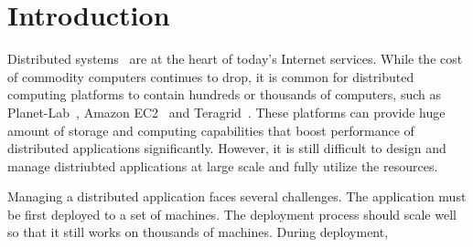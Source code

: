 \section{Introduction}


Distributed systems~\cite{Ghemawat2003, DeCandia2007} are at
the heart of today's Internet services. While the cost of
commodity computers continues to drop, it is common for
distributed computing platforms to contain hundreds or
thousands of computers, such as
Planet-Lab~\cite{Bavier2004}, Amazon
EC2~\cite{Garfinkel2007} and Teragrid~\cite{Catlett2002}.
These platforms can provide huge amount of storage and
computing capabilities that boost performance of distributed
applications significantly. However, it is still difficult to
design and manage distriubted applications at large scale
and fully utilize the resources.


Managing a distributed application faces several challenges.
The application must be first deployed to a set of machines.
The deployment process should scale well so that it still
works on thousands of machines. During deployment, 




